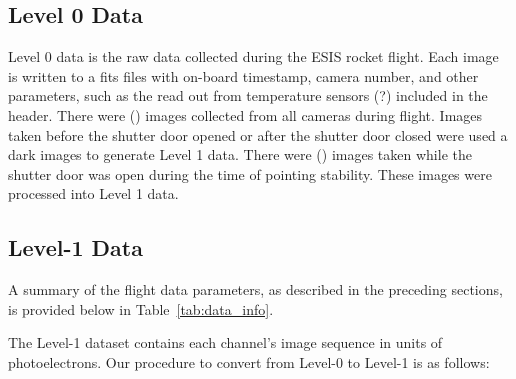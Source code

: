 {    \subsection{Level 0 Data}
	    Level 0 data is the raw data collected during the ESIS rocket flight.  
	    Each image is written to a fits files with on-board timestamp, camera number, and other parameters, such as the read out from temperature sensors (?) included in the header.  There were () images collected from all cameras during flight.  
	    Images taken before the shutter door opened or after the shutter door closed were used a dark images to generate Level 1 data.  
	    There were () images taken while the shutter door was open during the time of pointing stability.  
	    These images were processed into Level 1 data.  

    
    \subsection{Level-1 Data}
	    
  
    
    	
    	
    	A summary of the flight data parameters, as described in the preceding sections, is provided below in Table~\ref{tab:data_info}. 
    	
    	The Level-1 dataset contains each channel's image sequence in units of photoelectrons.
    	Our procedure to convert from Level-0 to Level-1 is as follows:
    	
}
